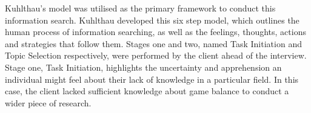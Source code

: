 Kuhlthau's model was utilised as the primary framework to conduct this information search. Kuhlthau developed this six step model, which outlines the human process of information searching, as well as the feelings, thoughts, actions and strategies that follow them. Stages one and two, named Task Initiation and Topic Selection respectively, were performed by the client ahead of the interview.
Stage one, Task Initiation, highlights the uncertainty and apprehension an individual might feel about their lack of knowledge in a particular field. In this case, the client lacked sufficient knowledge about game balance to conduct a wider piece of research. 
